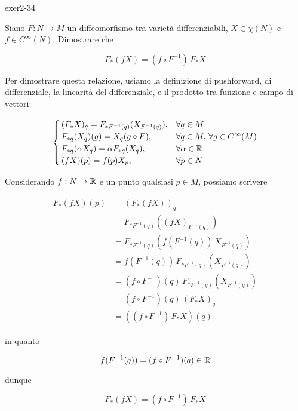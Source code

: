 {exer2-34}
{
Siano $ F : N \to M $ un diffeomorfismo tra varietà differenziabili, $ X \in \chi(N) $ e $ f \in C^{\infty}(N) $. Dimostrare che

\begin{equation}
	F_{*}(f X) = (f \circ F^{-1}) \, F_{*} X
\end{equation}
}
{
Per dimostrare questa relazione, usiamo la definizione di pushforward, di differenziale, la linearità del differenziale, e il prodotto tra funzione e campo di vettori:

\begin{equation}
	\begin{cases}
		(F_{*} X)_{q} = F_{*F^{-1}(q)} (X_{F^{-1}(q)}), & \forall q \in M \\
		F_{*q} (X_{q}) (g) = X_{q} (g \circ F), & \forall q \in M, \, \forall g \in C^{\infty}(M) \\
		F_{*q} (\alpha X_{q}) = \alpha F_{*q} (X_{q}), & \forall \alpha \in \mathbb{R} \\
		(f X)(p) = f(p) X_{p}, & \forall p \in N 
	\end{cases}
\end{equation}

Considerando $ f : N \to \mathbb{R} $ e un punto qualsiasi $ p \in M $, possiamo scrivere

\begin{align}
	\begin{split}
		F_{*}(f X)(p) &= (F_{*}(f X))_{q} \\
		&= F_{*F^{-1}(q)} ((f X)_{F^{-1}(q)}) \\
		&= F_{*F^{-1}(q)} (f(F^{-1}(q)) \, X_{F^{-1}(q)}) \\
		&= f(F^{-1}(q)) \, F_{*F^{-1}(q)} (X_{F^{-1}(q)}) \\
		&= (f \circ F^{-1})(q) \, F_{*F^{-1}(q)} (X_{F^{-1}(q)}) \\
		&= (f \circ F^{-1})(q) \, (F_{*} X)_{q} \\
		&= ((f \circ F^{-1}) \, F_{*} X)(q)
	\end{split}
\end{align}

in quanto

\begin{equation}
	f(F^{-1}(q)) = (f \circ F^{-1})(q) \in \mathbb{R}
\end{equation}

dunque

\begin{equation}
	F_{*}(f X) = (f \circ F^{-1}) \, F_{*} X
\end{equation}
}
